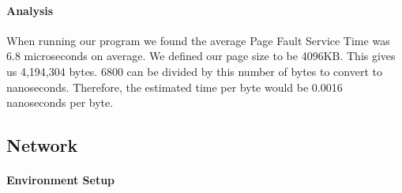 \paragraph{Analysis}

When running our program we found the average Page Fault Service Time was 6.8 microseconds on average. We defined our page size to be 4096KB. This gives us 4,194,304 bytes. 6800 can be divided by this number of bytes to convert to nanoseconds. Therefore, the estimated time per byte would be 0.0016 nanoseconds per byte.
\subsection{Network}


\paragraph{Environment Setup}

